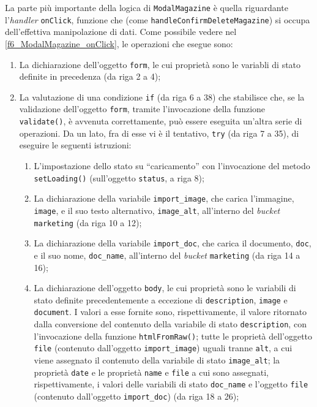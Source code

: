 
La parte più importante della logica di \texttt{ModalMagazine} è quella riguardante l'\textit{handler} \texttt{onClick}, funzione che (come \texttt{handleConfirmDeleteMagazine}) si occupa dell'effettiva manipolazione di dati. Come possibile vedere nel \autoref{f6_ModalMagazine_onClick}, le operazioni che esegue sono:
\begin{enumerate}
    \item La dichiarazione dell'oggetto \texttt{form}, le cui proprietà sono le variabli di stato definite in precedenza (da riga 2 a 4);
    
    \item La valutazione di una condizione \texttt{if} (da riga 6 a 38) che stabilisce che, se la validazione dell'oggetto \texttt{form}, tramite l'invocazione della funzione \texttt{validate()}, è avvenuta correttamente, può essere eseguita un'altra serie di operazioni. Da un lato, fra di esse vi è il tentativo, \texttt{try} (da riga 7 a 35), di eseguire le seguenti istruzioni:
        \begin{enumerate}
            \item L'impostazione dello stato su “caricamento” con l'invocazione del metodo \\\texttt{setLoading()} (sull'oggetto \texttt{status}, a riga 8);
    
            \item La dichiarazione della variabile \texttt{import\_image}, che carica l'immagine, \texttt{image}, e il suo testo alternativo, \texttt{image\_alt}, all'interno del \textit{bucket} \texttt{marketing} (da riga 10 a 12);
    
            \item La dichiarazione della variabile \texttt{import\_doc}, che carica il documento, \texttt{doc}, e il suo nome, \texttt{doc\_name}, all'interno del \textit{bucket} \texttt{marketing} (da riga 14 a 16);
    
            \item La dichiarazione dell'oggetto \texttt{body}, le cui proprietà sono le variabili di stato definite precedentemente a eccezione di \texttt{description}, \texttt{image} e \texttt{document}. I valori a esse fornite sono, rispettivamente, il valore ritornato dalla conversione del contenuto della variabile di stato \texttt{description}, con l'invocazione della funzione \texttt{htmlFromRaw()}; tutte le proprietà dell'oggetto \texttt{file} (contenuto dall'oggetto \texttt{import\_image}) uguali tranne \texttt{alt}, a cui viene assegnato il contenuto della variabile di stato \texttt{image\_alt}; la proprietà \texttt{date} e le proprietà \texttt{name} e \texttt{file} a cui sono assegnati, rispettivamente, i valori delle variabili di stato \texttt{doc\_name} e l'oggetto \texttt{file} (contenuto dall'oggetto \texttt{import\_doc}) (da riga 18 a 26);
    

\end{enumerate}
\end{enumerate}
